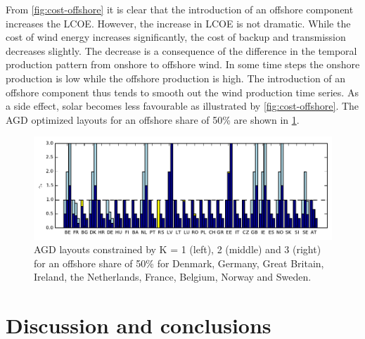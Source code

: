 \documentclass[a4paper, 5p, sort&compress]{elsarticle}%
\begin{document}
From \cref{fig:cost-offshore} it is clear that the introduction of an
offshore component increases the LCOE. However, the increase in LCOE
is not dramatic. While the cost of wind energy increases
significantly, the cost of backup and transmission decreases
slightly. The decrease is a consequence of the difference in the
temporal production pattern from onshore to offshore wind. In some
time steps the onshore production is low while the offshore production
is high. The introduction of an offshore component thus tends to
smooth out the wind production time series. As a side effect, solar
becomes less favourable as illustrated by
\cref{fig:cost-offshore}. The AGD optimized layouts for an offshore
share of 50\% are shown in \cref{fig:layout-offshore}.

\begin{figure}[p]
  \centering
  \includegraphics[width = 2\columnwidth, center]{offshoreLayouts}
  \caption{AGD layouts constrained by K = 1 (left), 2 (middle) and 3
    (right) for an offshore share of 50\% for Denmark, Germany, Great
    Britain, Ireland, the Netherlands, France, Belgium, Norway and
    Sweden.}
  \label{fig:layout-offshore}
\end{figure}

\section{Discussion and conclusions}
\label{sec:four}
\end{document}
